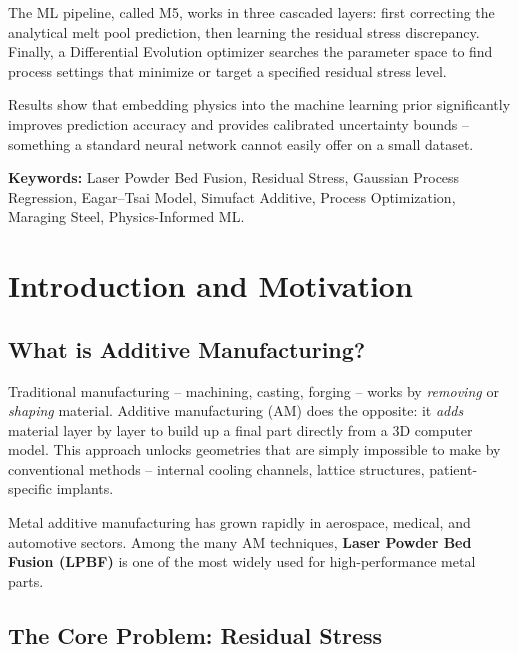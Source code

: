\documentclass[12pt,a4paper]{report}
\begin{document}
The ML pipeline, called M5, works in three cascaded layers: first correcting the analytical melt pool prediction, then learning the residual stress discrepancy. Finally, a Differential Evolution optimizer searches the parameter space to find process settings that minimize or target a specified residual stress level.

Results show that embedding physics into the machine learning prior significantly improves prediction accuracy and provides calibrated uncertainty bounds -- something a standard neural network cannot easily offer on a small dataset.

\vspace{0.5cm}
\noindent\textbf{Keywords:} Laser Powder Bed Fusion, Residual Stress, Gaussian Process Regression, Eagar--Tsai Model, Simufact Additive, Process Optimization, Maraging Steel, Physics-Informed ML.

\newpage
\tableofcontents

\chapter{Introduction and Motivation}

\section{What is Additive Manufacturing?}

Traditional manufacturing -- machining, casting, forging -- works by \textit{removing} or \textit{shaping} material. Additive manufacturing (AM) does the opposite: it \textit{adds} material layer by layer to build up a final part directly from a 3D computer model. This approach unlocks geometries that are simply impossible to make by conventional methods -- internal cooling channels, lattice structures, patient-specific implants.

Metal additive manufacturing has grown rapidly in aerospace, medical, and automotive sectors. Among the many AM techniques, \textbf{Laser Powder Bed Fusion (LPBF)} is one of the most widely used for high-performance metal parts.

\section{The Core Problem: Residual Stress}
\end{document}
